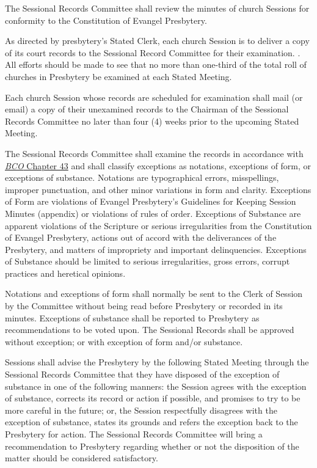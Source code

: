 \documentclass[
]{book}
\begin{document}
\begin{enumerate}
\begin{enumerate}
    The Sessional Records Committee shall review the minutes of church Sessions for conformity to the Constitution of Evangel Presbytery.

    As directed by presbytery's Stated Clerk, each church Session is to deliver a copy of its court records to the Sessional Record Committee for their examination. . All efforts should be made to see that no more than one-third of the total roll of churches in Presbytery be examined at each Stated Meeting.

    Each church Session whose records are scheduled for examination shall mail (or email) a copy of their unexamined records to the Chairman of the Sessional Records Committee no later than four (4) weeks prior to the upcoming Stated Meeting.

    The Sessional Records Committee shall examine the records in accordance with \href{https://bco.evangelpresbytery.com/the-rules-of-discipline.html\#general-review-and-control}{\emph{BCO} Chapter 43} and shall classify exceptions as notations, exceptions of form, or exceptions of substance. Notations are typographical errors, misspellings, improper punctuation, and other minor variations in form and clarity. Exceptions of Form are violations of Evangel Presbytery's Guidelines for Keeping Session Minutes (appendix) or violations of rules of order. Exceptions of Substance are apparent violations of the Scripture or serious irregularities from the Constitution of Evangel Presbytery, actions out of accord with the deliverances of the Presbytery, and matters of impropriety and important delinquencies. Exceptions of Substance should be limited to serious irregularities, gross errors, corrupt practices and heretical opinions.

    Notations and exceptions of form shall normally be sent to the Clerk of Session by the Committee without being read before Presbytery or recorded in its minutes. Exceptions of substance shall be reported to Presbytery as recommendations to be voted upon. The Sessional Records shall be approved without exception; or with exception of form and/or substance.

    Sessions shall advise the Presbytery by the following Stated Meeting through the Sessional Records Committee that they have disposed of the exception of substance in one of the following manners: the Session agrees with the exception of substance, corrects its record or action if possible, and promises to try to be more careful in the future; or, the Session respectfully disagrees with the exception of substance, states its grounds and refers the exception back to the Presbytery for action. The Sessional Records Committee will bring a recommendation to Presbytery regarding whether or not the disposition of the matter should be considered satisfactory.


\end{enumerate}
\end{enumerate}
\end{document}
